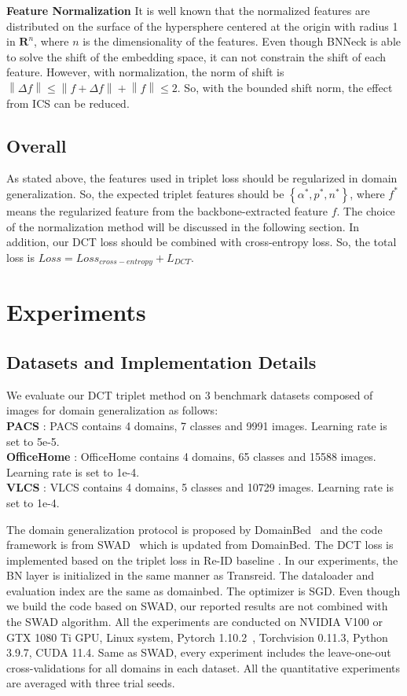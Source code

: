 \documentclass[a4paper,fleqn]{cas-dc}
\begin{document}
\noindent\textbf{Feature Normalization} It is well known that the normalized features are distributed on the surface of the hypersphere centered at the origin  with radius 1 in $\mathbf{R}^{n}$, where $n$ is the dimensionality of the features. Even though  BNNeck is able to solve the shift of the embedding space, it can not constrain the shift of each feature. However, with normalization, the norm of shift is $\left\|\Delta f\right\| \leq \left\|f+\Delta f\right\|+\left\|f\right\| \leq 2$. So, with the bounded shift norm, the effect from ICS can be reduced. 
\subsection{Overall}
As stated above, the features used in triplet loss should be regularized in domain generalization. So, the expected triplet features should be $\left\{\alpha^{\ast},p^{\ast},n^{\ast}\right\}$, where $f^{\ast}$ means the regularized feature from the backbone-extracted feature $f$. The choice of the normalization method will be discussed in the following section. In addition, our DCT loss should be combined with cross-entropy loss. So, the total loss is $Loss=Loss_{cross-entropy}+L_{DCT}$.  \section{Experiments}
\label{sec: Experiment}

\subsection{Datasets and Implementation Details}
We evaluate our DCT triplet method on 3 benchmark datasets composed of images for domain generalization as follows:\\
\textbf{PACS} \cite{PACS}: PACS contains 4 domains, 7 classes and 9991 images. Learning rate is set to 5e-5.\\
\textbf{OfficeHome} \cite{officehome}: OfficeHome contains 4 domains, 65 classes and 15588 images. Learning rate is set to 1e-4.\\
\textbf{VLCS} \cite{VLCS}: VLCS contains 4 domains, 5 classes and 10729 images. Learning rate is set to 1e-4.\par
The domain generalization protocol is proposed by DomainBed~\cite{domainbed} and the code framework is from SWAD~\cite{swad} which is updated from DomainBed. The DCT loss is implemented based on the triplet loss in Re-ID baseline \cite{reidsb,transreid}. In our experiments, the BN layer is initialized in the same manner as Transreid\cite{transreid}. The dataloader and evaluation index are the same as domainbed. The optimizer is SGD. Even though we build the code based on SWAD, our reported results are not combined with the SWAD algorithm. All the experiments are conducted on NVIDIA V100 or GTX 1080 Ti GPU, Linux system, Pytorch 1.10.2~\cite{pytorch}, Torchvision 0.11.3, Python 3.9.7, CUDA 11.4. Same as  SWAD, every experiment includes the leave-one-out cross-validations for all domains in each dataset. All the quantitative experiments are averaged with three trial seeds. 
\end{document}
